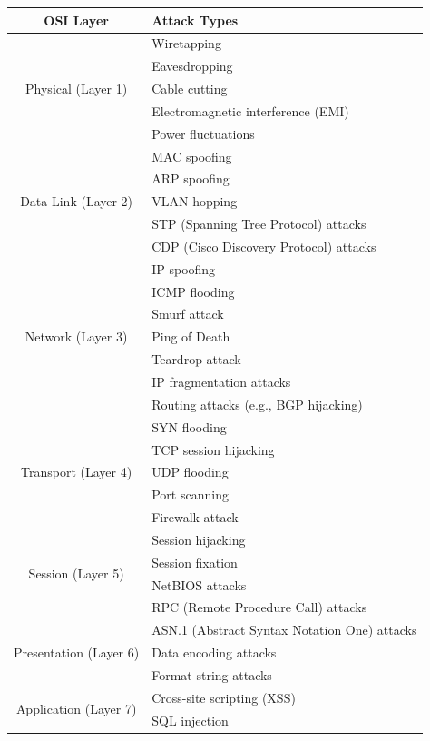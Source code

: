 \begin{table}[h!]
\footnotesize
\centering
\begin{tabular}{|c|l|}
\hline
\textbf{OSI Layer} & \textbf{Attack Types} \\
\hline
\multirow{5}{*}{Physical (Layer 1)} & Wiretapping \\
 & Eavesdropping \\
 & Cable cutting \\
 & Electromagnetic interference (EMI) \\
 & Power fluctuations \\
\hline
\multirow{5}{*}{Data Link (Layer 2)} & MAC spoofing \\
 & ARP spoofing \\
 & VLAN hopping \\
 & STP (Spanning Tree Protocol) attacks \\
 & CDP (Cisco Discovery Protocol) attacks \\
\hline
\multirow{7}{*}{Network (Layer 3)} & IP spoofing \\
 & ICMP flooding \\
 & Smurf attack \\
 & Ping of Death \\
 & Teardrop attack \\
 & IP fragmentation attacks \\
 & Routing attacks (e.g., BGP hijacking) \\
\hline
\multirow{5}{*}{Transport (Layer 4)} & SYN flooding \\
 & TCP session hijacking \\
 & UDP flooding \\
 & Port scanning \\
 & Firewalk attack \\
\hline
\multirow{4}{*}{Session (Layer 5)} & Session hijacking \\
 & Session fixation \\
 & NetBIOS attacks \\
 & RPC (Remote Procedure Call) attacks \\
\hline
\multirow{3}{*}{Presentation (Layer 6)} & ASN.1 (Abstract Syntax Notation One) attacks \\
 & Data encoding attacks \\
 & Format string attacks \\
\hline
\multirow{12}{*}{Application (Layer 7)} & Cross-site scripting (XSS) \\
 & SQL injection \\

\end{tabular}
\end{table}
